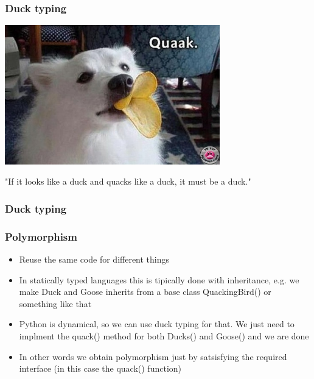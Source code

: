 \documentclass[9pt]{beamer}
\begin{document}
\begin{frame}
  \frametitle{Duck typing}
  
  \centering
  \includegraphics[width=0.7\textwidth]{quack.png}  
  
  \bigskip
  
  \centering
  "If it looks like a duck and quacks like a duck, it must be a duck."
  
\end{frame}


\begin{frame}
  \frametitle{Duck typing}
  
\end{frame}


\begin{frame}
  \frametitle{Polymorphism}
  
  \begin{itemize}
    \item Reuse the same code for different things
    \medskip
    \item In statically typed languages this is tipically done with inheritance,
          e.g. we make Duck and Goose inherits from a base class QuackingBird()
          or something like that
    \medskip
    \item Python is dynamical, so we can use duck typing for that.
          We just need to implment the quack() method for both Ducks() and Goose() 
          and we are done
    \medskip
    \item In other words we obtain polymorphism just by satsisfying the required \alert{interface}
          (in this case the quack() function)
  \end{itemize}
  
\end{frame}
\end{document}
